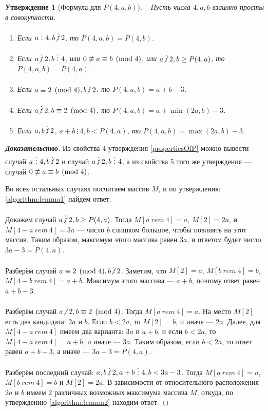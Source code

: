\documentclass[12pt]{article}
\newtheorem{proposition}[theorem]{Утверждение}
\begin{document}
\begin{proposition}[Формула для $P(4, a, b)$] { \ }
Пусть числа $4, a, b$ взаимно просты в совокупности.
\begin{enumerate}
	\item Если $a \ \vdots \ 4, b \centernot \vdots 2$, то $P(4, a, b) = P(4, b)$.

	\item Если $a \centernot \vdots 2, b \ \vdots \ 4$, или $0 \centernot \equiv a \equiv b \pmod 4$, или $a \centernot\vdots 2, b \ge P(4, a)$, то $P(4, a, b) = P(4, a)$.
	
	\item Если $a \equiv 2 \pmod 4, b \centernot \vdots 2$, то $P(4, a, b) = a + b - 3$.
		
	\item Если $a \centernot\vdots 2, b \equiv 2 \pmod 4$, то $P(4, a, b)= a + \min(2a, b) - 3$.

	\item Если $a, b \centernot \vdots 2$, $a + b \ \vdots \ 4, b < P(4, a)$, то $P(4, a, b) = \max(2a, b) - 3$. 
\end{enumerate}
\end{proposition}
\begin{proof}[\textbf{Доказательство}]
Из свойства 4 утверждения \ref{propertiesOfP} можно вывести случай $a \ \vdots \ 4, b \centernot \vdots 2$ и случай $a \centernot \vdots 2, b \ \vdots \ 4$, а из свойства 5 того же утверждения --- случай $0 \centernot \equiv a \equiv b \pmod 4$.

Во всех остальных случаях посчитаем массив $M$, и по утверждению \ref{algorithm:lemma1} найдём ответ.

Докажем случай $a \centernot\vdots 2, b \ge P(4, a)$. Тогда $M[a \ rem \ 4] = a$, $M[2] = 2a$, и $M[4 - a \ rem \ 4] = 3a$ --- число $b$ слишком большое, чтобы повлиять на этот массив. Таким образом, максимум этого массива равен $3a$, и ответом будет число $3a - 3 = P(4, a)$.

Разберём случай $a \equiv 2 \pmod 4, b \centernot\vdots 2$. Заметим, что $M[2] = a$, $M[b \ rem \ 4] = b$, $M[4 - b \ rem \ 4] = a + b$. Максимум этого массива --- $a + b$, поэтому ответ равен $a + b - 3$.

Разберём случай $a \centernot\vdots 2, b \equiv 2 \pmod 4$. Тогда $M[a \ rem \ 4] = a$. На место $M[2]$ есть два кандидата: $2a$ и $b$. Если $b < 2a$, то $M[2] = b$, и иначе --- $2a$. Далее, для $M[4 - a \ rem \ 4]$ имеем два варианта: $3a$ и $a + b$, и если $b < 2a$, то $M[4 - a \ rem \ 4] = a + b$, и иначе --- $3a$. Таким образом, если $b < 2a$, то ответ равен $a + b - 3$, а иначе --- $3a - 3 = P(4, a)$.

Разберём последний случай: $a, b \centernot \vdots 2, a + b \ \vdots \ 4, b < 3a - 3$. Тогда $M[a \ rem \ 4] = a$, $M[b \ rem \ 4] = b$ и $M[2] = 2a$. В зависимости от относительного расположения $2a$ и $b$ имеем $2$ различных возможных максимума массива $M$, откуда, по утверждению \ref{algorithm:lemma2} находим ответ.
\end{proof}
\end{document}
